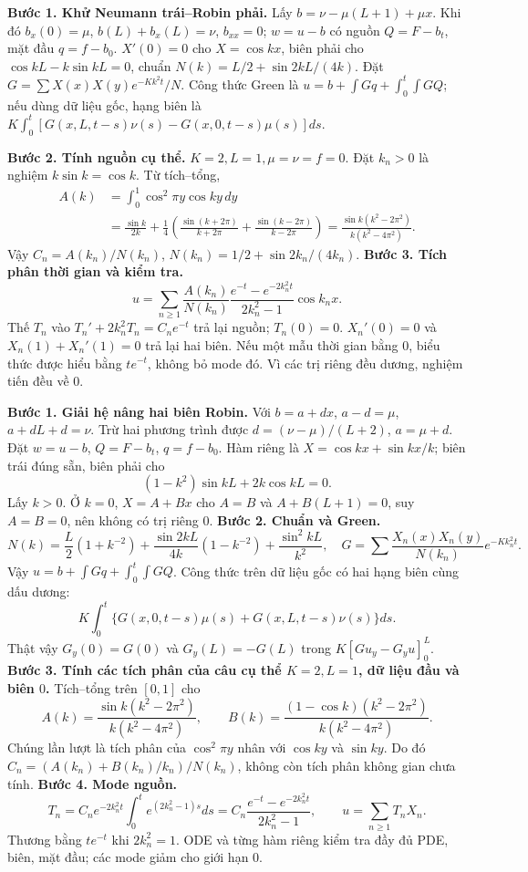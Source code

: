 \textbf{Bước 1. Khử Neumann trái–Robin phải.}
Lấy $b=\nu-\mu(L+1)+\mu x$. Khi đó $b_x(0)=\mu$, $b(L)+b_x(L)=\nu$, $b_{xx}=0$; $w=u-b$ có nguồn $Q=F-b_t$, mặt đầu $q=f-b_0$. $X'(0)=0$ cho $X=\cos kx$, biên phải cho $\cos kL-k\sin kL=0$, chuẩn $N(k)=L/2+\sin2kL/(4k)$. Đặt $G=\sum X(x)X(y)e^{-Kk^2t}/N$. Công thức Green là $u=b+\int Gq+\int_0^t\int GQ$; nếu dùng dữ liệu gốc, hạng biên là $K\int_0^t[G(x,L,t-s)\nu(s)-G(x,0,t-s)\mu(s)]ds$.

\textbf{Bước 2. Tính nguồn cụ thể.}
$K=2,L=1,\mu=\nu=f=0$. Đặt $k_n>0$ là nghiệm $k\sin k=\cos k$. Từ tích–tổng,
\begin{align*}
A(k)&=\int_0^1\cos^2\pi y\cos ky\,dy\\
&=\frac{\sin k}{2k}+\frac14\left(\frac{\sin(k+2\pi)}{k+2\pi}+\frac{\sin(k-2\pi)}{k-2\pi}\right)
=\frac{\sin k(k^2-2\pi^2)}{k(k^2-4\pi^2)}.
\end{align*}
Vậy $C_n=A(k_n)/N(k_n)$, $N(k_n)=1/2+\sin2k_n/(4k_n)$.
\textbf{Bước 3. Tích phân thời gian và kiểm tra.}
\[u=\sum_{n\ge1}\frac{A(k_n)}{N(k_n)}
\frac{e^{-t}-e^{-2k_n^2t}}{2k_n^2-1}\cos k_nx.\]
Thế $T_n$ vào $T_n'+2k_n^2T_n=C_ne^{-t}$ trả lại nguồn; $T_n(0)=0$. $X_n'(0)=0$ và $X_n(1)+X_n'(1)=0$ trả lại hai biên. Nếu một mẫu thời gian bằng $0$, biểu thức được hiểu bằng $te^{-t}$, không bỏ mode đó. Vì các trị riêng đều dương, nghiệm tiến đều về $0$.

\textbf{Bước 1. Giải hệ nâng hai biên Robin.}
Với $b=a+dx$, $a-d=\mu$, $a+dL+d=\nu$. Trừ hai phương trình được $d=(\nu-\mu)/(L+2)$, $a=\mu+d$. Đặt $w=u-b$, $Q=F-b_t$, $q=f-b_0$. Hàm riêng là $X=\cos kx+\sin kx/k$; biên trái đúng sẵn, biên phải cho
\[(1-k^2)\sin kL+2k\cos kL=0.\]
Lấy $k>0$. Ở $k=0$, $X=A+Bx$ cho $A=B$ và $A+B(L+1)=0$, suy $A=B=0$, nên không có trị riêng $0$.
\textbf{Bước 2. Chuẩn và Green.}
\[N(k)=\frac L2(1+k^{-2})+\frac{\sin2kL}{4k}(1-k^{-2})+\frac{\sin^2kL}{k^2},\quad
G=\sum\frac{X_n(x)X_n(y)}{N(k_n)}e^{-Kk_n^2t}.\]
Vậy $u=b+\int Gq+\int_0^t\int GQ$. Công thức trên dữ liệu gốc có hai hạng biên cùng dấu dương:
\[K\int_0^t\{G(x,0,t-s)\mu(s)+G(x,L,t-s)\nu(s)\}ds.\]
Thật vậy $G_y(0)=G(0)$ và $G_y(L)=-G(L)$ trong $K[Gu_y-G_yu]_0^L$.
\textbf{Bước 3. Tính các tích phân của câu cụ thể $K=2,L=1$, dữ liệu đầu và biên $0$.}
Tích–tổng trên $[0,1]$ cho
\[A(k)=\frac{\sin k(k^2-2\pi^2)}{k(k^2-4\pi^2)},\qquad
B(k)=\frac{(1-\cos k)(k^2-2\pi^2)}{k(k^2-4\pi^2)}.\]
Chúng lần lượt là tích phân của $\cos^2\pi y$ nhân với $\cos ky$ và $\sin ky$. Do đó $C_n=(A(k_n)+B(k_n)/k_n)/N(k_n)$, không còn tích phân không gian chưa tính.
\textbf{Bước 4. Mode nguồn.}
\[T_n=C_ne^{-2k_n^2t}\int_0^te^{(2k_n^2-1)s}ds
=C_n\frac{e^{-t}-e^{-2k_n^2t}}{2k_n^2-1},\qquad
u=\sum_{n\ge1}T_nX_n.\]
Thương bằng $te^{-t}$ khi $2k_n^2=1$. ODE và từng hàm riêng kiểm tra đầy đủ PDE, biên, mặt đầu; các mode giảm cho giới hạn $0$.

